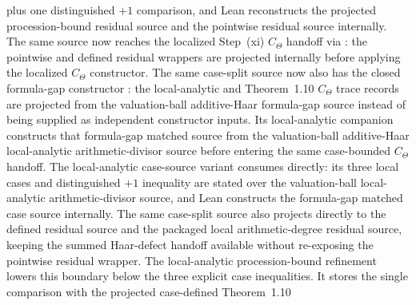 \begin{proposition}
  plus one distinguished \(+1\) comparison, and Lean reconstructs the
  projected procession-bound residual source and the pointwise residual source
  internally.  The same source now reaches the localized Step~(xi)
  \(C_\Theta\) handoff via
  :
  the pointwise and defined residual wrappers are projected internally before
  applying the localized \(C_\Theta\) constructor.  The same case-split source
  now also has the closed formula-gap constructor
  :
  the local-analytic and Theorem~1.10 \(C_\Theta\) trace records are projected
  from the valuation-ball additive-Haar formula-gap source instead of being
  supplied as independent constructor inputs.  Its local-analytic companion
  constructs that formula-gap matched source from the valuation-ball
  additive-Haar local-analytic arithmetic-divisor source before entering the
  same case-bounded \(C_\Theta\) handoff.  The local-analytic case-source
  variant
  consumes
  directly: its three local cases and distinguished \(+1\) inequality are
  stated over the valuation-ball local-analytic arithmetic-divisor source,
  and Lean constructs the formula-gap matched case source internally.  The
  same case-split source also projects directly to the defined residual source
  and the packaged local arithmetic-degree residual source, keeping the summed
  Haar-defect handoff available without re-exposing the pointwise residual
  wrapper.  The local-analytic procession-bound refinement
  lowers this boundary below the three explicit case inequalities.  It stores
  the single comparison with the projected case-defined Theorem~1.10

\end{proposition}
